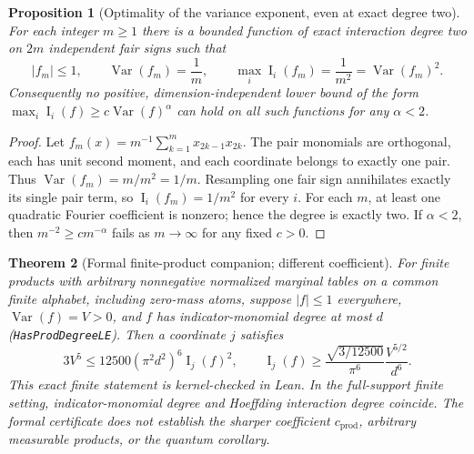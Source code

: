 \documentclass[11pt]{article}
\numberwithin{equation}{section}
\newtheorem{theorem}{Theorem}[section]
\newtheorem{proposition}[theorem]{Proposition}
\theoremstyle{remark}
\newcommand{\Var}{\operatorname{Var}}
\newcommand{\Inf}{\operatorname{I}}
\newcommand{\cprod}{c_{\mathrm{prod}}}
\begin{document}
\begin{proposition}[Optimality of the variance exponent, even at exact degree two]\label{prop:quadsharp}
For each integer $m\ge1$ there is a bounded function of \emph{exact} interaction degree two on $2m$ independent fair signs such that
\[
 |f_m|\le1,\qquad \Var(f_m)=\frac1m,\qquad
 \max_i\Inf_i(f_m)=\frac1{m^2}=\Var(f_m)^2.
\]
Consequently no positive, dimension-independent lower bound of the form $\max_i\Inf_i(f)\ge c\Var(f)^\alpha$ can hold on all such functions for any $\alpha<2$.
\end{proposition}
\begin{proof}
Let $f_m(x)=m^{-1}\sum_{k=1}^m x_{2k-1}x_{2k}$. The pair monomials are orthogonal, each has unit second moment, and each coordinate belongs to exactly one pair. Thus $\Var(f_m)=m/m^2=1/m$. Resampling one fair sign annihilates exactly its single pair term, so $\Inf_i(f_m)=1/m^2$ for every $i$. For each $m$, at least one quadratic Fourier coefficient is nonzero; hence the degree is exactly two. If $\alpha<2$, then $m^{-2}\ge c m^{-\alpha}$ fails as $m\to\infty$ for any fixed $c>0$.
\end{proof}



\begin{theorem}[Formal finite-product companion; different coefficient]\label{thm:lean}
For finite products with arbitrary nonnegative normalized marginal tables on a common finite alphabet, including zero-mass atoms, suppose $|f|\le1$ everywhere, $\Var(f)=V>0$, and $f$ has indicator-monomial degree at most $d$ (\texttt{HasProdDegreeLE}). Then a coordinate $j$ satisfies
\begin{equation}\label{eq:lean}
 3V^5\le12500(\pi^2d^2)^6\Inf_j(f)^2,\qquad
 \Inf_j(f)\ge\frac{\sqrt{3/12500}}{\pi^6}\frac{V^{5/2}}{d^6}.
\end{equation}
This exact finite statement is kernel-checked in Lean. In the full-support finite setting, indicator-monomial degree and Hoeffding interaction degree coincide. The formal certificate does \emph{not} establish the sharper coefficient $\cprod$, arbitrary measurable products, or the quantum corollary.
\end{theorem}
\end{document}
